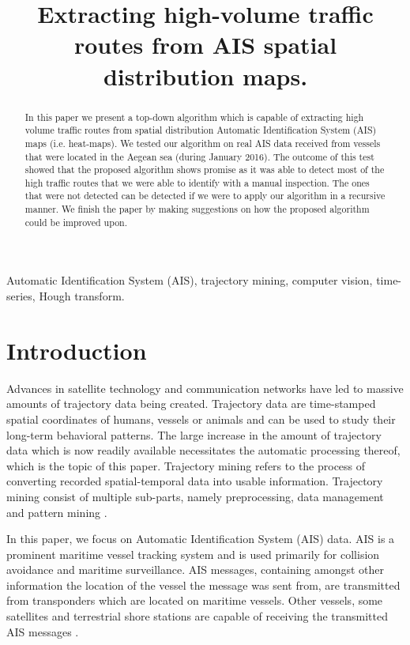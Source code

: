 \documentclass{article}
\title{Extracting high-volume traffic routes from AIS spatial distribution maps.}
\begin{document}
%
\maketitle
%
\begin{abstract}
In this paper we present a top-down algorithm which is capable of extracting high volume traffic routes from spatial distribution Automatic Identification System (AIS) maps (i.e. heat-maps).
We tested our algorithm on real AIS data received from vessels that were located in the Aegean sea (during January 2016). The outcome of this test 
showed that the proposed algorithm shows promise as it was able to detect most of the high traffic routes that we were able to identify with a manual inspection. The ones that were not detected can be detected if we were 
to apply our algorithm in a recursive manner. We finish the paper by making suggestions on how the proposed algorithm could be improved upon.
\end{abstract}
%
\begin{keywords}
Automatic Identification System (AIS), trajectory mining, computer vision, time-series, Hough transform.
\end{keywords}

\section{Introduction}
Advances in satellite technology and communication networks have led to massive amounts of trajectory data being created. 
Trajectory data are time-stamped spatial coordinates of humans, vessels or animals and can be used to study their long-term behavioral patterns. The large increase 
in the amount of trajectory data which is now readily available necessitates the automatic processing thereof, which is the topic of this paper.
Trajectory mining refers to the process of converting recorded spatial-temporal data into usable information. Trajectory mining consist of multiple sub-parts, namely 
preprocessing, data management and pattern mining \cite{zheng2015}.

In this paper, we focus on Automatic Identification System (AIS) data. AIS is a prominent maritime vessel tracking system and is used primarily 
for collision avoidance and maritime surveillance. AIS messages, containing amongst other information the location of the vessel the message was sent from, are transmitted from transponders which are located 
on maritime vessels. Other vessels, some satellites and terrestrial shore stations are capable of receiving the transmitted AIS messages \cite{li2017}.
\end{document}
